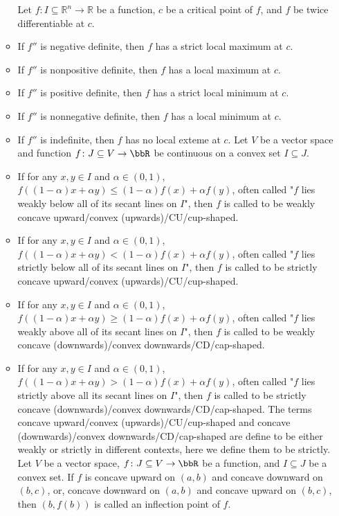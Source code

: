 \documentclass[a4paper,12pt]{report}
\begin{document}
\begin{itemize}
\begin{itemize}
\eit
{}
Let $f\colon I\subseteq\mathbb{R}^n\to\mathbb{R}$ be a function, $c$ be a critical point of $f$, and $f$ be twice differentiable at $c$.
\bit
\item If $f''$ is negative definite, then $f$ has a strict local maximum at $c$.
\item If $f''$ is nonpositive definite, then $f$ has a local maximum at $c$.
\item If $f''$ is positive definite, then $f$ has a strict local minimum at $c$.
\item If $f''$ is nonnegative definite, then $f$ has a local minimum at $c$.
\item If $f''$ is indefinite, then $f$ has no local exteme at $c$.
\eit
{}
Let $V$ be a vector space and function $f\colon J\subseteq V\to\bbR$ be continuous on a convex set $I\subseteq J$.
\bit
\item If for any $x,y\in I$ and $\alpha\in(0,1)$, $f((1-\alpha)x+\alpha y)\leq (1-\alpha)f(x)+\alpha f(y)$, often called "$f$ lies weakly below all of its secant lines on $I$", then $f$ is called to be weakly concave upward/convex (upwards)/CU/cup-shaped.
\item If for any $x,y\in I$ and $\alpha\in(0,1)$, $f((1-\alpha)x+\alpha y)<(1-\alpha)f(x)+\alpha f(y)$, often called "$f$ lies strictly below all of its secant lines on $I$", then $f$ is called to be strictly concave upward/convex (upwards)/CU/cup-shaped.
\item If for any $x,y\in I$ and $\alpha\in(0,1)$, $f((1-\alpha)x+\alpha y)\geq (1-\alpha)f(x)+\alpha f(y)$, often called "$f$ lies weakly above all of its secant lines on $I$", then $f$ is called to be weakly concave (downwards)/convex downwards/CD/cap-shaped.
\item If for any $x,y\in I$ and $\alpha\in(0,1)$, $f((1-\alpha)x+\alpha y)>(1-\alpha)f(x)+\alpha f(y)$, often called "$f$ lies strictly above all its secant lines on $I$", then $f$ is called to be strictly concave (downwards)/convex downwards/CD/cap-shaped.
\eit
The terms concave upward/convex (upwards)/CU/cup-shaped and concave (downwards)/convex downwards/CD/cap-shaped are define to be either weakly or strictly in different contexts, here we define them to be strictly.
Let $V$ be a vector space, $f\colon J\subseteq V\to\bbR$ be a function, and $I\subseteq J$ be a convex set. If $f$ is concave upward on $(a,b)$ and concave downward on $(b,c)$, or, concave downward on $(a,b)$ and concave upward on $(b,c)$, then $(b,f(b))$ is called an inflection point of $f$.

\end{itemize}
\end{itemize}
\end{document}
